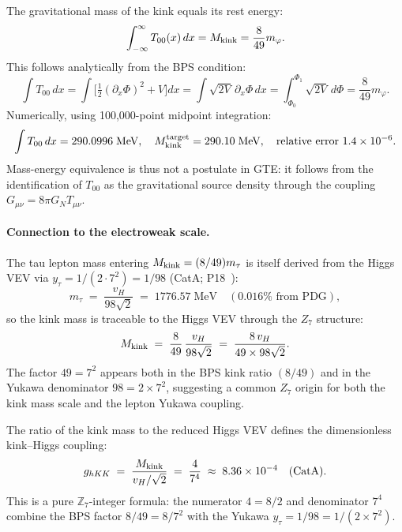 \documentclass[11pt]{article}
\theoremstyle{remark}
\newcommand{\Mkink}{M_{\rm kink}}
\newcommand{\mtau}{m_\tau}
\newcommand{\Tmunu}{T_{\mu\nu}}
\newcommand{\GN}{G_N}
\begin{document}
The gravitational mass of the kink equals its rest energy:
\begin{equation}
  \int_{-\infty}^{\infty} T_{00}(x)\,dx = \Mkink = \frac{8}{49}m_\varphi.
\label{eq:mass_integral}
\end{equation}
This follows analytically from the BPS condition:
\begin{equation}
  \int T_{00}\,dx = \int\bigl[\tfrac{1}{2}(\partial_x\Phi)^2 + V\bigr]dx
  = \int\sqrt{2V}\,\partial_x\Phi\,dx = \int_{\Phi_0}^{\Phi_1}\sqrt{2V}\,d\Phi
  = \frac{8}{49}m_\varphi.
\label{eq:bps_mass}
\end{equation}
Numerically, using 100,000-point midpoint integration:
\[
  \int T_{00}\,dx = 290.0996\;\text{MeV}, \quad M_{\rm kink}^{\rm target} = 290.10\;\text{MeV},
  \quad \text{relative error } 1.4\times10^{-6}.
\]
Mass-energy equivalence is thus not a postulate in GTE: it follows from the
identification of $T_{00}$ as the gravitational source density through the coupling
$G_{\mu\nu} = 8\pi\GN\Tmunu$.

\paragraph{Connection to the electroweak scale.}
The tau lepton mass entering $\Mkink = (8/49)\mtau$ is itself derived from the Higgs VEV via $y_\tau = 1/(2 \cdot 7^2) = 1/98$ (CatA; P18~\cite{Spivack2026_Koide}):
\begin{equation}
m_\tau \;=\; \frac{v_H}{98\sqrt{2}} \;=\; 1776.57\;\text{MeV} \quad (0.016\%\text{ from PDG}),
\label{eq:mtau_vH}
\end{equation}
so the kink mass is traceable to the Higgs VEV through the $Z_7$ structure:
\begin{equation}
\Mkink \;=\; \frac{8}{49}\,\frac{v_H}{98\sqrt{2}} \;=\; \frac{8\,v_H}{49 \times 98\sqrt{2}}.
\label{eq:mkink_vH}
\end{equation}
The factor $49 = 7^2$ appears both in the BPS kink ratio $(8/49)$ and in the Yukawa denominator $98 = 2 \times 7^2$, suggesting a common $Z_7$ origin for both the kink mass scale and the lepton Yukawa coupling.

The ratio of the kink mass to the reduced Higgs VEV defines the dimensionless kink--Higgs coupling:
\begin{equation}
g_{hKK} \;=\; \frac{\Mkink}{v_H/\sqrt{2}} \;=\; \frac{4}{7^4} \;\approx\; 8.36 \times 10^{-4} \quad (\text{CatA}).
\label{eq:ghKK}
\end{equation}
This is a pure $\mathbb{Z}_7$-integer formula: the numerator $4 = 8/2$ and denominator $7^4$ combine the BPS factor $8/49 = 8/7^2$ with the Yukawa $y_\tau = 1/98 = 1/(2 \times 7^2)$.
\end{document}
